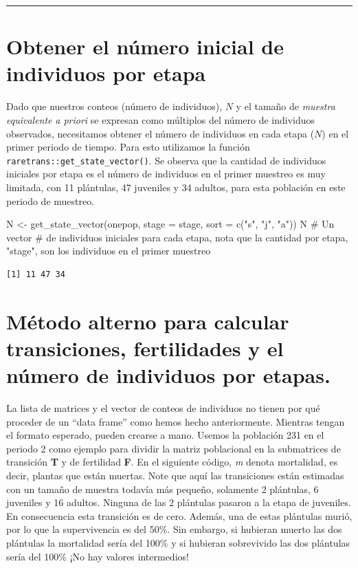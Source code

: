 \documentclass[
  12pt,
  letterpaper,
]{book}
\newenvironment{Shaded}{\begin{snugshade}}{\end{snugshade}}
\newcommand{\AttributeTok}[1]{\textcolor[rgb]{0.40,0.45,0.13}{#1}}
\newcommand{\CommentTok}[1]{\textcolor[rgb]{0.37,0.37,0.37}{#1}}
\newcommand{\FunctionTok}[1]{\textcolor[rgb]{0.28,0.35,0.67}{#1}}
\newcommand{\NormalTok}[1]{\textcolor[rgb]{0.00,0.23,0.31}{#1}}
\newcommand{\OtherTok}[1]{\textcolor[rgb]{0.00,0.23,0.31}{#1}}
\newcommand{\StringTok}[1]{\textcolor[rgb]{0.13,0.47,0.30}{#1}}
\begin{document}
\begin{center}\rule{0.5\linewidth}{0.5pt}\end{center}

\section{Obtener el número inicial de individuos por
etapa}\label{obtener-el-nuxfamero-inicial-de-individuos-por-etapa}

Dado que nuestros conteos (número de individuos), \(N\) y el tamaño de
\emph{muestra equivalente} \emph{a priori} se expresan como múltiplos
del número de individuos observados, necesitamos obtener el número de
individuos en cada etapa (\(N\)) en el primer periodo de tiempo. Para
esto utilizamos la función \texttt{raretrans::get\_state\_vector()}. Se
observa que la cantidad de individuos iniciales por etapa es el número
de individuos en el primer muestreo es muy limitada, con 11 plántulas,
47 juveniles y 34 adultos, para esta población en este periodo de
muestreo.

\begin{Shaded}
\begin{Highlighting}[]
\NormalTok{N }\OtherTok{\textless{}{-}} \FunctionTok{get\_state\_vector}\NormalTok{(onepop, }\AttributeTok{stage =}\NormalTok{ stage, }\AttributeTok{sort =} \FunctionTok{c}\NormalTok{(}\StringTok{"s"}\NormalTok{, }\StringTok{"j"}\NormalTok{, }\StringTok{"a"}\NormalTok{))}
\NormalTok{N }\CommentTok{\# Un vector \# de individuos iniciales para cada etapa, nota que la cantidad por etapa, "stage", son los individuos en el primer muestreo}
\end{Highlighting}
\end{Shaded}

\begin{verbatim}
[1] 11 47 34
\end{verbatim}

\section{Método alterno para calcular transiciones, fertilidades y el
número de individuos por
etapas.}\label{muxe9todo-alterno-para-calcular-transiciones-fertilidades-y-el-nuxfamero-de-individuos-por-etapas.}

La lista de matrices y el vector de conteos de individuos no tienen por
qué proceder de un ``data frame'' como hemos hecho anteriormente.
Mientras tengan el formato esperado, pueden crearse a mano. Usemos la
población 231 en el periodo 2 como ejemplo para dividir la matriz
poblacional en la submatrices de transición \textbf{T} y de fertilidad
\textbf{F}. En el siguiente código, \emph{m} denota mortalidad, es
decir, plantas que están muertas. Note que aquí las transiciones están
estimadas con un tamaño de muestra todavía más pequeño, solamente 2
plántulas, 6 juveniles y 16 adultos. Ninguna de las 2 plántulas pasaron
a la etapa de juveniles. En consecuencia esta transición es de cero.
Además, una de estas plántulas murió, por lo que la supervivencia es del
50\%. Sin embargo, si hubieran muerto las dos plántulas la mortalidad
sería del 100\% y si hubieran sobrevivido las dos plántulas sería del
100\% ¡No hay valores intermedios!
\end{document}
